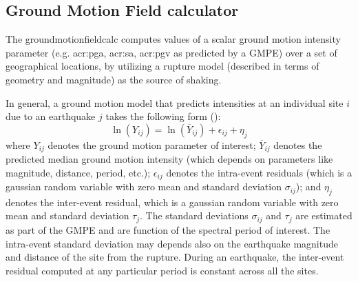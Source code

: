 \subsection{Ground Motion Field calculator}
The \gls{groundmotionfieldcalc} computes values of a scalar
ground motion intensity parameter (e.g. \gls{acr:pga}, \gls{acr:sa}, 
\gls{acr:pgv} as predicted 
by a GMPE) over a set of geographical locations, by utilizing a 
rupture model (described in terms of geometry and magnitude) as 
the source of shaking.

In general, a ground motion model that predicts intensities at 
an individual site $i$ due to an earthquake $j$ takes the following 
form (\cite{jayaram2009}):
%
\begin{equation}
\ln (Y_{ij}) = \ln (\overline{Y}_{ij})+\epsilon_{ij}+\eta_{j}
\label{gmfeq}
\end{equation}
%
where $Y_{ij}$ denotes the ground motion parameter of interest; 
$\overline{Y}_{ij}$ denotes the predicted median ground motion 
intensity (which depends on parameters like magnitude, distance, 
period, etc.); $\epsilon_{ij}$ denotes the intra-event residuals 
(which is a gaussian random variable with zero mean and standard 
deviation $\sigma_{ij}$); and $\eta_{j}$ denotes the inter-event 
residual, which is a gaussian random variable with zero mean and 
standard deviation $\tau_{j}$. The standard deviations $\sigma_{ij}$ 
and $\tau_{j}$ are estimated as part of the GMPE and are function of 
the spectral period of interest. The intra-event standard deviation 
may depends also on the earthquake magnitude and distance of the 
site from the rupture. During an earthquake, the inter-event residual
computed at any particular period is constant across all the sites.

